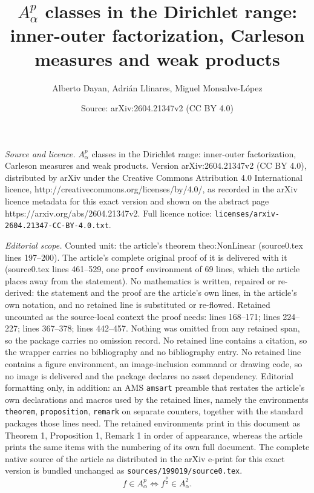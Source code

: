 \documentclass[10pt,a4paper]{amsart}
\title{$A^p_\alpha$ classes in the Dirichlet range: inner-outer factorization, Carleson measures and weak products}
\author{Alberto Dayan, Adri\'an Llinares, Miguel Monsalve-L\'opez}
\date{Source: arXiv:2604.21347v2 (CC BY 4.0)}
\begin{document}
\maketitle

\noindent\emph{Source and licence.} $A^p_\alpha$ classes in the Dirichlet range: inner-outer factorization, Carleson measures and weak products. Version arXiv:2604.21347v2 (CC BY 4.0), distributed by arXiv under the Creative Commons Attribution 4.0 International licence, http://creativecommons.org/licenses/by/4.0/, as recorded in the arXiv licence metadata for this exact version and shown on the abstract page https://arxiv.org/abs/2604.21347v2. Full licence notice: \texttt{licenses/arxiv-2604.21347-CC-BY-4.0.txt}.\par\smallskip

\noindent\textit{Editorial scope.} Counted unit: the article's theorem theo:NonLinear (source0.tex lines 197--200). The article's complete original proof of it is delivered with it (source0.tex lines 461--529, one \texttt{proof} environment of 69 lines, which the article places away from the statement). No mathematics is written, repaired or re-derived: the statement and the proof are the article's own lines, in the article's own notation, and no retained line is substituted or re-flowed.  Retained uncounted as the source-local context the proof needs: lines 168--171; lines 224--227; lines 367--378; lines 442--457.  Nothing was omitted from any retained span, so the package carries no omission record.  No retained line contains a citation, so the wrapper carries no bibliography and no bibliography entry.  No retained line contains a figure environment, an image-inclusion command or drawing code, so no image is delivered and the package declares no asset dependency.  Editorial formatting only, in addition: an AMS \texttt{amsart} preamble that restates the article's own declarations and macros used by the retained lines, namely the environments \texttt{theorem}, \texttt{proposition}, \texttt{remark} on separate counters, together with the standard packages those lines need.  The retained environments print in this document as Theorem 1, Proposition 1, Remark 1 in order of appearance, whereas the article prints the same items with the numbering of its own full document.  The complete native source of the article as distributed in the arXiv e-print for this exact version is bundled unchanged as \texttt{sources/199019/source0.tex}.
            \begin{equation}
                \label{eqn:nonvanishing}
                f\in A^p_\alpha\iff f^\frac{p}{2}\in A^2_\alpha.
            \end{equation}
\end{document}
